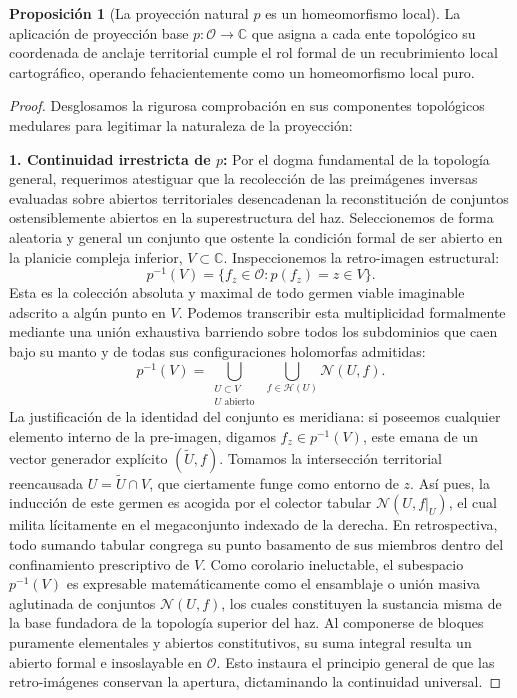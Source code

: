 \documentclass[11pt,a4paper]{article}
\theoremstyle{definition}
\newtheorem{proposicion}{Proposición}[section]
\theoremstyle{remark}
\numberwithin{equation}{section}
\begin{document}
\begin{proposicion}[La proyección natural $p$ es un homeomorfismo local]
La aplicación de proyección base $p: \mathcal{O} \to \mathbb{C}$ que asigna a cada ente topológico su coordenada de anclaje territorial cumple el rol formal de un recubrimiento local cartográfico, operando fehacientemente como un homeomorfismo local puro.
\end{proposicion}
\begin{proof}
Desglosamos la rigurosa comprobación en sus componentes topológicos medulares para legitimar la naturaleza de la proyección:

\textbf{1. Continuidad irrestricta de $p$:}
Por el dogma fundamental de la topología general, requerimos atestiguar que la recolección de las preimágenes inversas evaluadas sobre abiertos territoriales desencadenan la reconstitución de conjuntos ostensiblemente abiertos en la superestructura del haz.
Seleccionemos de forma aleatoria y general un conjunto que ostente la condición formal de ser abierto en la planicie compleja inferior, $V \subset \mathbb{C}$. Inspeccionemos la retro-imagen estructural:
\begin{equation}
p^{-1}(V) = \{ f_z \in \mathcal{O} : p(f_z) = z \in V \}.
\end{equation}
Esta es la colección absoluta y maximal de todo germen viable imaginable adscrito a algún punto en $V$. Podemos transcribir esta multiplicidad formalmente mediante una unión exhaustiva barriendo sobre todos los subdominios que caen bajo su manto y de todas sus configuraciones holomorfas admitidas:
\begin{equation}
p^{-1}(V) = \bigcup_{ \substack{U \subset V \\ U \text{ abierto}}} \; \bigcup_{f \in \mathcal{H}(U)} \mathcal{N}(U, f).
\end{equation}
La justificación de la identidad del conjunto es meridiana: si poseemos cualquier elemento interno de la pre-imagen, digamos $f_z \in p^{-1}(V)$, este emana de un vector generador explícito $(\widetilde{U}, f)$. Tomamos la intersección territorial reencausada $U = \widetilde{U} \cap V$, que ciertamente funge como entorno de $z$. Así pues, la inducción de este germen es acogida por el colector tabular $\mathcal{N}(U, f|_U)$, el cual milita lícitamente en el megaconjunto indexado de la derecha. En retrospectiva, todo sumando tabular congrega su punto basamento de sus miembros dentro del confinamiento prescriptivo de $V$.
Como corolario ineluctable, el subespacio $p^{-1}(V)$ es expresable matemáticamente como el ensamblaje o unión masiva aglutinada de conjuntos $\mathcal{N}(U,f)$, los cuales constituyen la sustancia misma de la base fundadora de la topología superior del haz. Al componerse de bloques puramente elementales y abiertos constitutivos, su suma integral resulta un abierto formal e insoslayable en $\mathcal{O}$. Esto instaura el principio general de que las retro-imágenes conservan la apertura, dictaminando la continuidad universal.


\end{proof}
\end{document}
